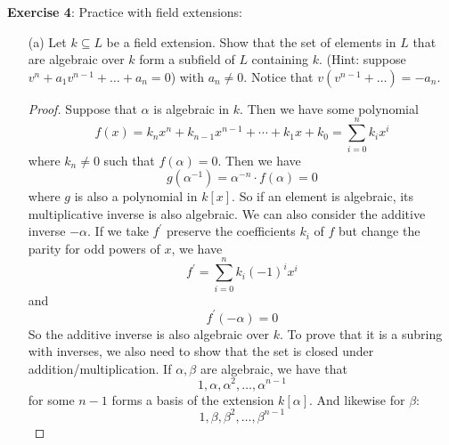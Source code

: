 \documentclass{article}
\begin{document}
\textbf{Exercise 4}: Practice with field extensions:
    \begin{itemize}
        \item [(a)] Let $k \subseteq L$ be a field extension. Show that the set of elements in $L$ that are algebraic over $k$ form a subfield of $L$ containing $k$. (Hint: suppose $v^{n} + a_{1}v^{n - 1} + \ldots + a_{n} = 0$) with $a_{n} \neq 0$. Notice that $v(v^{n - 1} + \ldots) = -a_{n}$.
            \begin{proof}
                Suppose that $\alpha$ is algebraic in $k$. Then we have some polynomial
                    \begin{equation*}
                        f(x) = k_{n}x^{n} + k_{n - 1}x^{n - 1} + \cdots + k_{1}x + k_{0} = \sum_{i = 0}^{n} k_{i}x^{i}
                    \end{equation*}
                where $k_{n} \neq 0$ such that $f(\alpha) = 0$. Then we have
                    \begin{equation*}
                        g(\alpha^{-1}) = \alpha^{-n} \cdot f(\alpha) = 0
                    \end{equation*}
                where $g$ is also a polynomial in $k[x]$. So if an element is algebraic, its multiplicative inverse is also algebraic. We can also consider the additive inverse $-\alpha$. If we take $f^{\prime}$ preserve the coefficients $k_{i}$ of $f$ but change the parity for odd powers of $x$, we have
                    \begin{equation*}
                        f^{\prime} = \sum_{i = 0}^{n} k_{i}(-1)^{i}x^{i}
                    \end{equation*}
                and
                    \begin{equation*}
                        f^{\prime}(-\alpha) = 0
                    \end{equation*}
                So the additive inverse is also algebraic over $k$. To prove that it is a subring with inverses, we also need to show that the set is closed under addition/multiplication. If $\alpha, \beta$ are algebraic, we have that 
                    \begin{equation*}
                        1, \alpha, \alpha^{2}, \ldots , \alpha^{n-1}
                    \end{equation*}
                for some $n - 1$ forms a basis of the extension $k[\alpha]$. And likewise for $\beta$:
                    \begin{equation*}
                        1, \beta, \beta^{2}, \ldots , \beta^{n - 1}

\end{equation*}
\end{proof}
\end{itemize}
\end{document}
